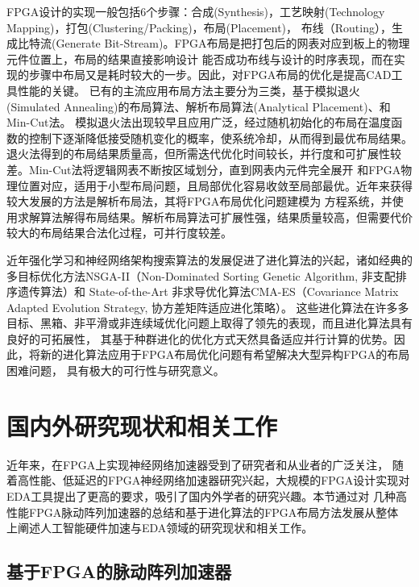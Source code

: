 FPGA设计的实现一般包括6个步骤\cite{li2017utplacef}：合成(Synthesis)，工艺映射(Technology Mapping)，打包(Clustering/Packing)，布局(Placement)，
布线（Routing），生成比特流(Generate Bit-Stream)。FPGA布局是把打包后的网表对应到板上的物理元件位置上，布局的结果直接影响设计
能否成功布线与设计的时序表现，而在实现的步骤中布局又是耗时较大的一步。因此，对FPGA布局的优化是提高CAD工具性能的关键。
已有的主流应用布局方法主要分为三类，基于模拟退火(Simulated Annealing)的布局算法\cite{kirkpatrick1983optimization}、解析布局算法(Analytical Placement)\cite{gort2012analytical}、和Min-Cut法\cite{maidee2003fast}。
模拟退火法出现较早且应用广泛，经过随机初始化的布局在温度函数的控制下逐渐降低接受随机变化的概率，使系统冷却，从而得到最优布局结果。
退火法得到的布局结果质量高，但所需迭代优化时间较长，并行度和可扩展性较差。Min-Cut法将逻辑网表不断按区域划分，直到网表内元件完全展开
和FPGA物理位置对应，适用于小型布局问题，且局部优化容易收敛至局部最优。近年来获得较大发展的方法是解析布局法，其将FPGA布局优化问题建模为
方程系统，并使用求解算法解得布局结果。解析布局算法可扩展性强，结果质量较高，但需要代价较大的布局结果合法化过程，可并行度较差。

近年强化学习\cite{li2019deep}和神经网络架构搜索算法\cite{lu2019nsga,nn2016cma}的发展促进了进化算法的兴起，诸如经典的多目标优化方法NSGA-II\cite{deb2002fast}（Non-Dominated Sorting Genetic Algorithm, 
非支配排序遗传算法）和 State-of-the-Art 非求导优化算法CMA-ES\cite{cmapaper}（Covariance Matrix Adapted Evolution Strategy, 协方差矩阵适应进化策略）。
这些进化算法在许多多目标、黑箱、非平滑或非连续域优化问题上取得了领先的表现，而且进化算法具有良好的可拓展性，
其基于种群进化的优化方式天然具备适应并行计算的优势。因此，将新的进化算法应用于FPGA布局优化问题有希望解决大型异构FPGA的布局困难问题，
具有极大的可行性与研究意义。


\section{国内外研究现状和相关工作}
\label{sec:related_work}
近年来，在FPGA上实现神经网络加速器受到了研究者和从业者的广泛关注，
随着高性能、低延迟的FPGA神经网络加速器研究兴起，大规模的FPGA设计实现对
EDA工具提出了更高的要求，吸引了国内外学者的研究兴趣。本节通过对
几种高性能FPGA脉动阵列加速器的总结和基于进化算法的FPGA布局方法发展从整体
上阐述人工智能硬件加速与EDA领域的研究现状和相关工作。


\subsection{基于FPGA的脉动阵列加速器}

